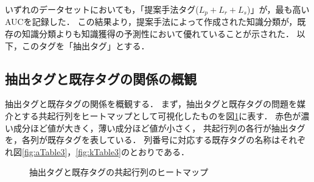 いずれのデータセットにおいても，「提案手法タグ($L_p + L_r + L_s$)」が，最も高いAUCを記録した．
この結果より，提案手法によって作成された知識分類が，既存の知識分類よりも知識獲得の予測性において優れていることが示された．
以下，このタグを「抽出タグ」とする．


\subsection{抽出タグと既存タグの関係の概観}
抽出タグと既存タグの関係を概観する．
まず，抽出タグと既存タグの問題を媒介とする共起行列をヒートマップとして可視化したものを図\ref{fig:Heatmap}に表す．
赤色が濃い成分ほど値が大きく，薄い成分ほど値が小さく，
共起行列の各行が抽出タグを，各列が既存タグを表している．
列番号に対応する既存タグの名称はそれぞれ図\ref{fig:aTable3}，\ref{fig:kTable3}のとおりである．

\begin{figure}[H]
\begin{center}
\hspace*{-20pt}
\end{center}
\caption{抽出タグと既存タグの共起行列のヒートマップ}
\label{fig:Heatmap}
\end{figure}



